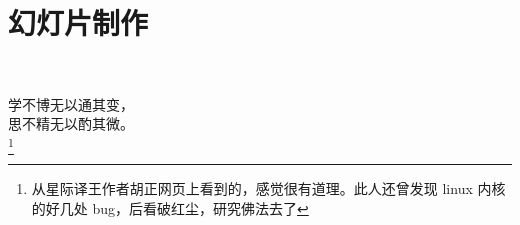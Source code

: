 \chapter{幻灯片制作}
\thispagestyle{fancy}

~\\[9cm]
\begin{flushright}
\kai\xiaosi
\textcolor[rgb]{0.00,0.50,0.00}{
学不博无以通其变，\\
思不精无以酌其微。\\\footnote{\textcolor[rgb]{0.00,0.50,0.00}{从星际译王作者胡正网页上看到的，感觉很有道理。此人还曾发现 linux 内核的好几处 bug，后看破红尘，研究佛法去了}}\\
}
\end{flushright}






